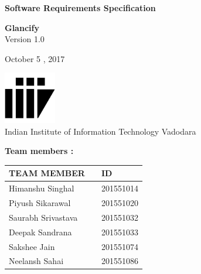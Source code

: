 \documentclass[12pt]{article}
\renewcommand{\today}{October 5 , 2017}
\begin{document}
\begin{titlepage}
		\begin{center}
			
			
			\LARGE{\textbf{Software Requirements Specification}}
			
			\vspace{1.5cm}
			
			\textbf{Glancify}\\
			
			\small{Version 1.0}
			\vspace{3cm}
		 
        	\today
			
			\vspace{1.5cm}
			
			
			
			\vspace{5cm}
			\includegraphics[width=0.17\textwidth]{iiitv.png} \\
			\Large{Indian Institute of Information Technology Vadodara} \\
			
		\end{center}
	\end{titlepage}
	\newpage
\textbf{Team members :} \\
\begin{center}
	\begin{tabular}{ |m{10em} m{8em} m{9em}|}
		\hline
		TEAM MEMBER        &   & ID        \\
		\hline
		Himanshu Singhal             &   & 201551014 \\
		Piyush Sikarawal          &   & 201551020 \\
		Saurabh Srivastava              &   & 201551032 \\
	    Deepak Sandrana     &   & 201551033 \\
		Sakshee Jain    &   & 201551074 \\
		Neelansh Sahai    &   & 201551086 \\ 
		\hline
	\end{tabular}
	
\end{center}
\end{document}
